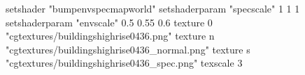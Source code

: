 setshader "bumpenvspecmapworld"
setshaderparam "specscale" 1 1 1
setshaderparam "envscale"  0.5 0.55 0.6
    texture 0 "cgtextures/buildingshighrise0436.png"
    texture n "cgtextures/buildingshighrise0436_normal.png"
    texture s "cgtextures/buildingshighrise0436_spec.png"
    texscale 3